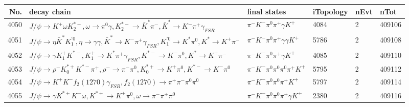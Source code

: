 \begin{table}[htbp] 
\begin{center}
\begin{small}
\begin{tabular}{rlllll}\hline\hline
 No. & decay chain & final states &  iTopology & nEvt & nTot \\\hline
4050&$J/\psi       \rightarrow K^{+}          \omega         K_2^{*-}       , \omega          \rightarrow \pi^{0}        \gamma       , K_2^{*-}        \rightarrow \bar{K}^{*}   \pi^{-}        , \bar{K}^{*}    \rightarrow K^{-}          \pi^{+}        \gamma_{FSR} $&$\pi^{-}        K^{-}          \pi^{0}        \pi^{+}        \gamma       K^{+}          $& 4084&    2&409106\\
4051&$J/\psi       \rightarrow \eta          \bar{K}^{*}   K_1^{'0}      , \eta           \rightarrow \gamma       \gamma       , \bar{K}^{*}    \rightarrow K^{-}          \pi^{+}        \gamma_{FSR} , K_1^{'0}       \rightarrow K^{*}          \pi^{0}        , K^{*}           \rightarrow K^{+}          \pi^{-}        $&$\pi^{-}        K^{-}          \pi^{0}        \pi^{+}        \gamma       \gamma       K^{+}          $& 5786&    2&409108\\
4052&$J/\psi       \rightarrow \gamma       K_1^{+}        K^{*-}         , K_1^{+}         \rightarrow K^{*}          \pi^{+}        \gamma_{FSR} , K^{*-}          \rightarrow K^{-}          \pi^{0}        , K^{*}           \rightarrow K^{+}          \pi^{-}        $&$\pi^{-}        K^{-}          \pi^{0}        \pi^{+}        \gamma       K^{+}          $& 4085&    2&409110\\
4053&$J/\psi       \rightarrow \rho^{-}      K_{0}^{*+}     K^{*-}         \pi^{+}        , \rho^{-}       \rightarrow \pi^{-}        \pi^{0}        , K_{0}^{*+}      \rightarrow K^{+}          \pi^{0}        , K^{*-}          \rightarrow K^{-}          \pi^{0}        $&$\pi^{-}        K^{-}          \pi^{0}        \pi^{0}        \pi^{0}        \pi^{+}        K^{+}          $& 5795&    2&409112\\
4054&$J/\psi       \rightarrow K^{+}          K^{-}          f_{2}(1270)    \gamma_{FSR} , f_{2}(1270)     \rightarrow \pi^{+}        \pi^{-}        \pi^{0}        \pi^{0}        $&$\pi^{-}        K^{-}          \pi^{0}        \pi^{0}        \pi^{+}        K^{+}          $& 5797&    2&409114\\
4055&$J/\psi       \rightarrow \gamma       K^{*+}         K^{-}          \omega         , K^{*+}          \rightarrow K^{+}          \pi^{0}        , \omega          \rightarrow \pi^{-}        \pi^{+}        \pi^{0}        $&$\pi^{-}        K^{-}          \pi^{0}        \pi^{0}        \pi^{+}        \gamma       K^{+}          $& 2380&    2&409116\\

\end{tabular}
\end{small}
\end{center}
\end{table}
